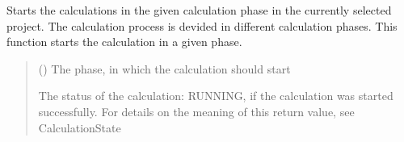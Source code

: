 \documentclass[letterpaper,10pt,english]{sphinxmanual}
\begin{document}
\begin{fulllineitems}
\begin{fulllineitems}
\begin{quote}
\begin{description}
\sphinxAtStartPar
{}

\end{description}\end{quote}

\end{fulllineitems}


\begin{fulllineitems}
\label{\detokenize{apidoc/src.osm_configurator.control:src.osm_configurator.control.control_interface.IControl.start_calculations}}
\pysigstartsignatures
{}
\pysigstopsignatures
\sphinxAtStartPar
Starts the calculations in the given calculation phase in the currently selected project.
The calculation process is devided in different calculation phases. This function starts the calculation in a given phase.
\begin{quote}\begin{description}
\sphinxAtStartPar
{} ({\hyperref[\detokenize{apidoc/src.osm_configurator.model.project.calculation:src.osm_configurator.model.project.calculation.calculation_phase_enum.CalculationPhase}]{}}) \textendash{} The phase, in which the calculation should start

\sphinxAtStartPar
The status of the calculation: RUNNING, if the calculation was started successfully. For details on the meaning of this return value, see CalculationState

\sphinxAtStartPar
{\hyperref[\detokenize{apidoc/src.osm_configurator.model.project.calculation:src.osm_configurator.model.project.calculation.calculation_state_enum.CalculationState}]{}}

\end{description}\end{quote}

\end{fulllineitems}


\end{fulllineitems}
\end{document}
